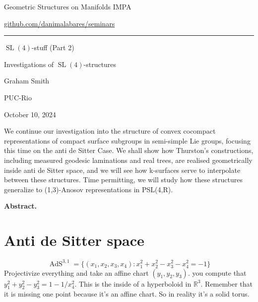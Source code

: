 



\begin{minipage}{\textwidth}
	\begin{minipage}{1\textwidth}
		Geometric Structures on Manifolds \hfill IMPA
		
		{\small\hfill\href{https://github.com/danimalabares/seminars}{github.com/danimalabares/seminars}}

		
	\end{minipage}
\end{minipage}\vspace{.2cm}\hrule

\vspace{10pt}

{\Huge  $\operatorname{SL}(4)$-stuff (Part 2)}

{\Large Investigations of $\operatorname{SL}(4)$-structures}


\hfill{\Large Graham Smith}

{\Large \hfill PUC-Rio}

\hfill{\large October 10, 2024}

\vspace{1em}
We continue our investigation into the structure of convex cocompact representations of compact surface subgroups in semi-simple Lie groups, focusing this time on the anti de Sitter Case. We shall show how Thurston's constructions, including measured geodesic laminations and real trees, are realised geometrically inside anti de Sitter space, and we will see how k-surfaces serve to interpolate between these structures. Time permitting, we will study how these structures generalize to (1,3)-Anosov representations in PSL(4,R).

{\color{6}\bfseries Abstract.}\hspace{.5em} 

\tableofcontents

\section{Anti de Sitter space}

\[\operatorname{A d S}^{3,1}=\{(x_1,x_2,x_3,x_4):x_1^2+x_2^2-x_3^2-x_4^2=-1\}\]
Projectivize everything and take an affine chart $(y_1,y_2,y_3)$. you compute that $y_1^2+y_2^2-y_3^2=1-1/x_4^2$. This is the inside of a hyperboloid in $\mathbb{R}^{3}$. Remember that it is missing one point because it's an affine chart. So in reality it's a solid torus.


